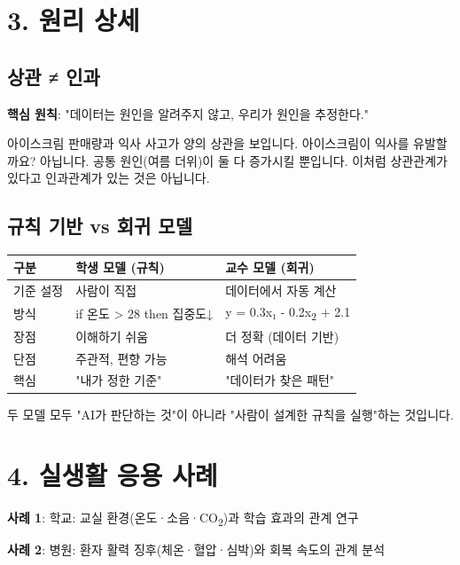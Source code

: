 \documentclass[11pt,a4paper]{article}
\begin{document}
\section*{3. 원리 상세}

\subsection*{상관 ≠ 인과}

\textbf{핵심 원칙}: "데이터는 원인을 알려주지 않고, 우리가 원인을 추정한다."


아이스크림 판매량과 익사 사고가 양의 상관을 보입니다. 아이스크림이 익사를 유발할까요? 아닙니다. 공통 원인(여름 더위)이 둘 다 증가시킬 뿐입니다. 이처럼 상관관계가 있다고 인과관계가 있는 것은 아닙니다.


\subsection*{규칙 기반 vs 회귀 모델}

\begin{center}
\renewcommand{\arraystretch}{1.4}
\begin{tabular}{|p{2.2cm}|p{6.5cm}|p{6.2cm}|}
\hline
\rowcolor{tableheader}
\textbf{구분} & \textbf{학생 모델 (규칙)} & \textbf{교수 모델 (회귀)} \\
\hline
기준 설정 & 사람이 직접 & 데이터에서 자동 계산 \\
\hline
방식 & if 온도 > 28 then 집중도↓ & y = 0.3x₁ - 0.2x\textsubscript{2} + 2.1 \\
\hline
장점 & 이해하기 쉬움 & 더 정확 (데이터 기반) \\
\hline
단점 & 주관적, 편향 가능 & 해석 어려움 \\
\hline
핵심 & "내가 정한 기준" & "데이터가 찾은 패턴" \\
\hline
\end{tabular}
\end{center}

두 모델 모두 "AI가 판단하는 것"이 아니라 "사람이 설계한 규칙을 실행"하는 것입니다.



\section*{4. 실생활 응용 사례}

\textbf{사례 1}: 학교: 교실 환경(온도·소음·CO\textsubscript{2})과 학습 효과의 관계 연구


\textbf{사례 2}: 병원: 환자 활력 징후(체온·혈압·심박)와 회복 속도의 관계 분석
\end{document}
